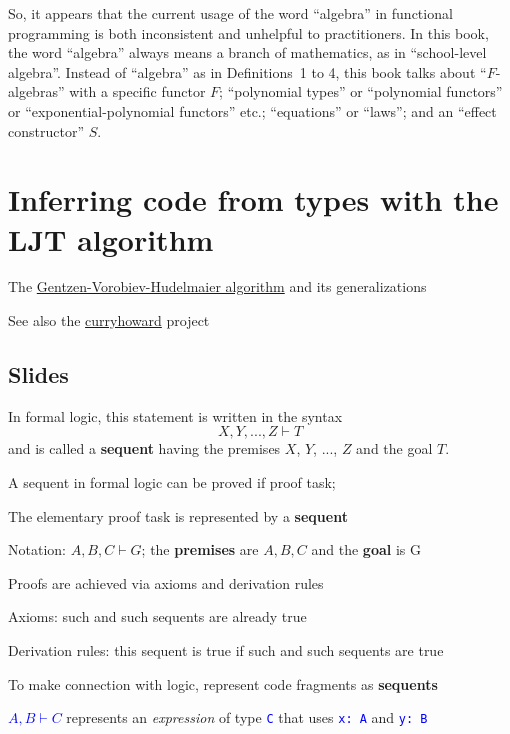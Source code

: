 So, it appears that the current usage of the word ``algebra'' in
functional programming is both inconsistent and unhelpful to practitioners.
In this book, the word ``algebra'' always means a branch of mathematics,
as in ``school-level algebra''. Instead of ``algebra'' as in Definitions~1
to 4, this book talks about ``$F$-algebras'' with a specific functor
$F$; ``polynomial types'' or ``polynomial functors'' or ``exponential-polynomial
functors'' etc.; ``equations'' or ``laws''; and an ``effect
constructor'' $S$.

\chapter{Inferring code from types with the LJT algorithm\label{app:CH-correspondence-LJT-algorithm}}

The \href{http://apt13.unibe.ch/slides/Dyckhoff.pdf}{Gentzen-Vorobiev-Hudelmaier algorithm}
and its generalizations

See also the \href{https://github.com/Chymyst/curryhoward}{curryhoward}
project

\section{Slides}

In formal logic, this statement is written in the syntax
\[
X,Y,...,Z\vdash T
\]
and is called a \textbf{sequent} having the premises
$X$, $Y$, ..., $Z$ and the goal $T$.

A sequent in formal logic can be proved if proof task;

The elementary proof task is represented by a \textbf{sequent}

Notation: $A,B,C\vdash G$; the \textbf{premises} are $A,B,C$ and
the \textbf{goal} is G

Proofs are achieved via axioms and derivation rules

Axioms: such and such sequents are already true

Derivation rules: this sequent is true if such and such sequents are
true

To make connection with logic, represent code fragments as \textbf{sequents}

\textcolor{blue}{$A,B\vdash C$} represents an \emph{expression} of
type \texttt{\textcolor{blue}{\footnotesize{}C}} that uses \texttt{\textcolor{blue}{\footnotesize{}x:\ A}}
and \texttt{\textcolor{blue}{\footnotesize{}y:\ B}}{\footnotesize\par}

